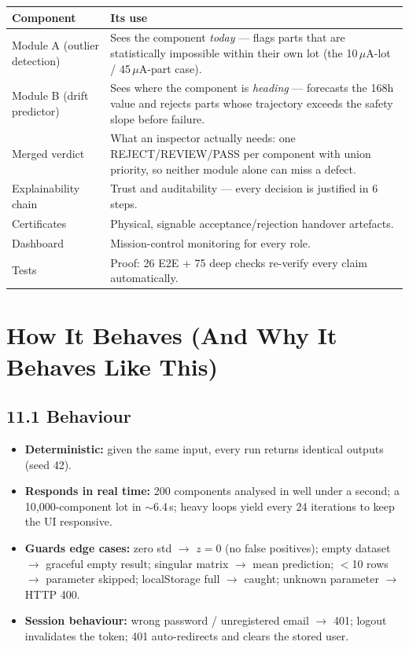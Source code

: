 \documentclass[11pt,a4paper]{article}
\begin{document}
\begin{center}
\begin{longtable}{@{}p{4.4cm}p{10.2cm}@{}}
\toprule
\textbf{Component} & \textbf{Its use}\\
\midrule
\endhead
Module A (outlier detection) & Sees the component \emph{today} --- flags parts that are
  statistically impossible within their own lot (the 10\,$\mu$A-lot / 45\,$\mu$A-part case).\\
\addlinespace
Module B (drift predictor) & Sees where the component is \emph{heading} --- forecasts the 168h
  value and rejects parts whose trajectory exceeds the safety slope before failure.\\
\addlinespace
Merged verdict & What an inspector actually needs: one REJECT/REVIEW/PASS per component with union
  priority, so neither module alone can miss a defect.\\
\addlinespace
Explainability chain & Trust and auditability --- every decision is justified in 6 steps.\\
\addlinespace
Certificates & Physical, signable acceptance/rejection handover artefacts.\\
\addlinespace
Dashboard & Mission-control monitoring for every role.\\
\addlinespace
Tests & Proof: 26 E2E + 75 deep checks re-verify every claim automatically.\\
\bottomrule
\end{longtable}
\end{center}

\section{How It Behaves (And Why It Behaves Like This)}

\subsection*{11.1 Behaviour}
\begin{itemize}[leftmargin=1.5em]
  \item \textbf{Deterministic:} given the same input, every run returns identical outputs (seed 42).
  \item \textbf{Responds in real time:} 200 components analysed in well under a second; a
        10{,}000-component lot in $\sim$6.4\,s; heavy loops yield every 24 iterations to keep the UI
        responsive.
  \item \textbf{Guards edge cases:} zero std $\rightarrow$ $z=0$ (no false positives); empty dataset
        $\rightarrow$ graceful empty result; singular matrix $\rightarrow$ mean prediction;
        $<$10 rows $\rightarrow$ parameter skipped; localStorage full $\rightarrow$ caught;
        unknown parameter $\rightarrow$ HTTP 400.
  \item \textbf{Session behaviour:} wrong password / unregistered email $\rightarrow$ 401; logout
        invalidates the token; 401 auto-redirects and clears the stored user.
\end{itemize}
\end{document}
